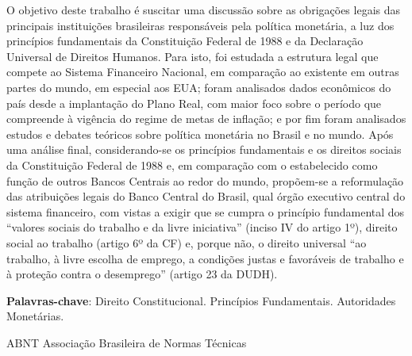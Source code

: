 \documentclass[
	10pt,				%
	openright,			%
	twoside,			%
	a5paper,			%
	english,			%
	french,				%
	spanish,			%
	brazil				%
	]{abntex2}
\newcommand{\listasdousuario}{}
\begin{document}
\setlength{\absparsep}{18pt} %
\begin{resumo}

  O objetivo deste trabalho é suscitar uma discussão sobre as obrigações
  legais das principais instituições brasileiras responsáveis pela
  política monetária, a luz dos princípios fundamentais da Constituição
  Federal de 1988 e da Declaração Universal de Direitos Humanos. Para
  isto, foi estudada a estrutura legal que compete ao Sistema Financeiro
  Nacional, em comparação ao existente em outras partes do mundo, em
  especial aos EUA; foram analisados dados econômicos do país desde a
  implantação do Plano Real, com maior foco sobre o período que compreende
  à vigência do regime de metas de inflação; e por fim foram analisados
  estudos e debates teóricos sobre política monetária no Brasil e no
  mundo. Após uma análise final, considerando-se os princípios
  fundamentais e os direitos sociais da Constituição Federal de 1988 e, em
  comparação com o estabelecido como função de outros Bancos Centrais ao
  redor do mundo, propõem-se a reformulação das atribuições legais do
  Banco Central do Brasil, qual órgão executivo central do sistema
  financeiro, com vistas a exigir que se cumpra o princípio fundamental
  dos ``valores sociais do trabalho e da livre iniciativa'' (inciso IV do
  artigo 1º), direito social ao trabalho (artigo 6º da CF) e, porque não,
  o direito universal ``ao trabalho, à livre escolha de emprego, a
  condições justas e favoráveis de trabalho e à proteção contra o
  desemprego'' (artigo 23 da DUDH).

 \textbf{Palavras-chave}: Direito Constitucional. Princípios Fundamentais. Autoridades Monetárias.
\end{resumo}









\listasdousuario

\begin{siglas}
  \item[ABNT] Associação Brasileira de Normas Técnicas
\end{siglas}
\end{document}
